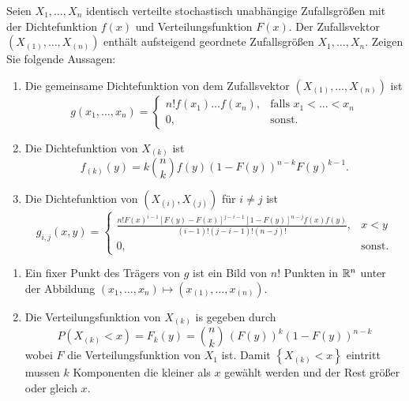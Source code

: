  Seien $X_1,\dots ,X_n$
identisch verteilte stochastisch unabhängige Zufallsgrößen mit der
Dichtefunktion $f(x)$ und Verteilungsfunktion $F(x)$. Der Zufallsvektor $\left(
X_{(1)},\dots ,X_{(n)} \right)$ enthält aufsteigend geordnete Zufallsgrößen
$X_1,\dots ,X_n$. Zeigen Sie folgende Aussagen:
\begin{enumerate}
    \item Die gemeinsame Dichtefunktion von dem Zufallsvektor $\left( X_{(1)},\dots ,X_{(n)} \right)$
        ist
        \begin{equation*}
            g(x_{1},\dots ,x_n) = \begin{cases}
                n! f(x_1)\dots f(x_n), & \text{falls } x_{1} < \dots < x_n \\
                0, & \text{sonst.}
            \end{cases}
        \end{equation*}

    \item Die Dichtefunktion von $X_{(k)}$ ist
        \begin{equation*}
            f_{(k)}(y) = k \binom{n}{k} f(y) (1-F(y))^{n-k} F(y)^{k-1}.
        \end{equation*}

    \item Die Dichtefunktion von $(X_{(i)},X_{(j)})$ für $i\neq j$ ist
        \begin{equation*}
            g_{i,j}(x,y)= \begin{cases}
                \frac{n! F(x)^{i-1} [F(y)-F(x)]^{j-i-1} [1-F(y)]^{n-j}f(x)f(y) }{ (i-1)! (j-i-1)! (n-j)! }, & x<y \\
                0, & \text{sonst.}
            \end{cases}
        \end{equation*}
\end{enumerate}

\solution
\begin{enumerate}
    \item Ein fixer Punkt des Trägers von $g$ ist ein Bild von $n!$ Punkten in
        $\mathbb R^n$ unter der Abbildung $(x_1,\dots ,x_n)\mapsto (x_{(1)},\dots
        ,x_{(n)})$.
    \item Die Verteilungsfunktion von $X_{(k)}$ is gegeben durch
        \begin{equation*}
            P(X_{(k)} < x) = F_{k}(y) = \binom{n}{k}\, (F(y))^{k} \left( 1-F(y)  \right)^{n-k}
        \end{equation*}
        wobei $F$ die Verteilungsfunktion von $X_1$ ist. Damit $\left\{ X_{
        (k)} < x \right\}$ eintritt mussen $k$ Komponenten die kleiner als $x$
        gewählt werden und der Rest größer oder gleich $x$. 
\end{enumerate}



